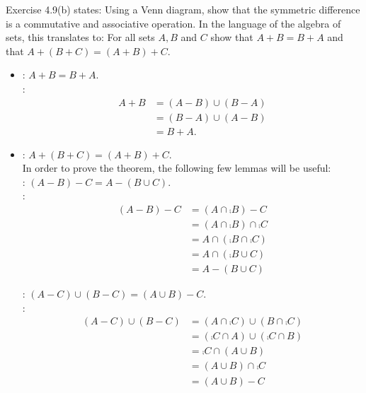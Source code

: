 \documentclass[11pt]{book}
\begin{document}
\begin{enumerate}
{Exercise 4.9(b) states: Using a Venn diagram, show that the symmetric difference is a commutative and associative operation. In the language of the algebra of sets, this translates to: For all sets $A,B$ and $C$ show that $A + B = B + A$ and that $A + (B + C) = (A + B) + C$.
\begin{itemize}
\item {}: $A + B = B + A$.\\
: \begin{align*}A + B &= (A - B) \cup (B - A)\tag{Definition of symmetric difference}\\&=
(B - A) \cup (A - B)\tag{5.1.2}\\&= 
B + A.\tag{Definition of symmetric difference}\end{align*}
\item {}: $A + (B + C) = (A + B) + C$.\\
In order to prove the theorem, the following few lemmas will be useful:\\
: $(A - B) - C = A - (B \cup C)$.\\
: \begin{align*}(A - B) - C &= (A \cap \comp{B}) - C \tag{Definition of relative complement}\\&= (A \cap \comp{B}) \cap \comp{C}\tag{Definition of relative complement}\\&= A \cap (\comp{B} \cap \comp{C}) \tag{5.1.1'}\\&= A \cap (\comp{B \cup C})\tag{5.1.13}\\&= A - (B \cup C)\tag{Definition of relative complement}\end{align*} 

: $(A - C) \cup (B - C) = (A \cup B) - C$.\\
: \begin{align*}(A - C) \cup (B - C) &= (A \cap \comp{C}) \cup (B \cap \comp{C})\tag{Definition of relative complement}\\&= (\comp{C} \cap A) \cup (\comp{C} \cap B)\tag{5.1.2'}\\&= \comp{C} \cap (A \cup B)\tag{5.1.3'}\\&= (A \cup B) \cap \comp{C}\tag{5.1.2'}\\&= (A \cup B) - C \tag{Definition of relative complement}\end{align*}


\end{itemize}}
\end{enumerate}
\end{document}

